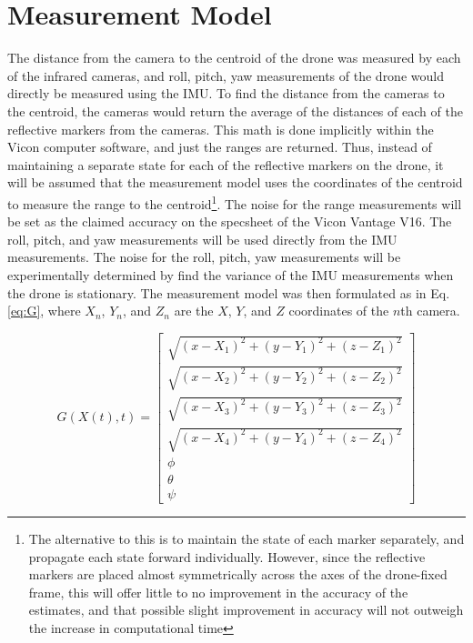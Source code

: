 \documentclass[letterpaper, preprint, paper,11pt]{AAS}	%
\begin{document}
\section{Measurement Model}

The distance from the camera to the centroid of the drone was measured by each of the infrared cameras, and roll, pitch, yaw measurements of the drone would directly be measured using the IMU. To find the distance from the cameras to the centroid, the cameras would return the average of the distances of each of the reflective markers from the cameras. This math is done implicitly within the Vicon computer software, and just the ranges are returned. Thus, instead of maintaining a separate state for each of the reflective markers on the drone, it will be assumed that the measurement model uses the coordinates of the centroid to measure the range to the centroid\footnote{The alternative to this is to maintain the state of each marker separately, and propagate each state forward individually. However, since the reflective markers are placed almost symmetrically across the axes of the drone-fixed frame, this will offer little to no improvement in the accuracy of the estimates, and that possible slight improvement in accuracy will not outweigh the increase in computational time}. The noise for the range measurements will be set as the claimed accuracy on the specsheet of the Vicon Vantage V16. The roll, pitch, and yaw measurements will be used directly from the IMU measurements. The noise for the roll, pitch, yaw measurements will be experimentally determined by find the variance of the IMU measurements when the drone is stationary. The measurement model was then formulated as in Eq. \ref{eq:G}, where $X_n$, $Y_n$, and $Z_n$ are the $X$, $Y$, and $Z$ coordinates of the $n$th camera.

\begin{equation}
\label{eq:G}
G(X(t), t) = 
\begin{bmatrix}
	\sqrt{(x-X_1)^2 + (y-Y_1)^2 + (z-Z_1)^2} \\
	\sqrt{(x-X_2)^2 + (y-Y_2)^2 + (z-Z_2)^2} \\
	\sqrt{(x-X_3)^2 + (y-Y_3)^2 + (z-Z_3)^2} \\
	\sqrt{(x-X_4)^2 + (y-Y_4)^2 + (z-Z_4)^2} \\
	\phi \\
	\theta \\
	\psi
\end{bmatrix}
\end{equation}
\end{document}

